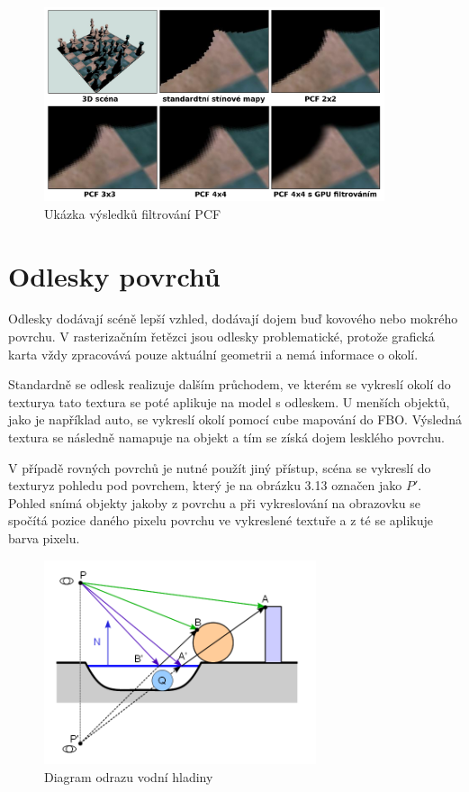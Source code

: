\documentclass[11pt,twoside,a4paper]{book}
\begin{document}
\begin{center}
\begin{figure}[h]
\includegraphics[width=100mm]{figures/pcf-example.png}
\caption{Ukázka výsledků filtrování PCF}
\end{figure}
\end{center}
\newpage


\section{Odlesky povrchů}
Odlesky dodávají scéně lepší vzhled, dodávají dojem buď kovového nebo mokrého povrchu. V rasterizačním řetězci jsou odlesky problematické, protože grafická karta vždy zpracovává pouze aktuální geometrii a nemá informace o okolí.

Standardně se odlesk realizuje dalším průchodem, ve kterém se vykreslí okolí do textury\linebreak a tato textura se poté aplikuje na model s odleskem. U menších objektů, jako je například auto, se vykreslí okolí pomocí cube mapování do FBO. Výsledná textura se následně namapuje na objekt a tím se získá dojem lesklého povrchu.

V případě rovných povrchů je nutné použít jiný přístup, scéna se vykreslí do textury\linebreak z pohledu pod povrchem, který je na obrázku 3.13 označen jako $P'$. Pohled snímá objekty jakoby z povrchu a při vykreslování na obrazovku se spočítá pozice daného pixelu povrchu ve vykreslené textuře a z té se aplikuje barva pixelu.

\begin{figure}[h!]
\begin{center}
\includegraphics[width=80mm]{figures/reflection-diagram.png}
\caption{Diagram odrazu vodní hladiny \cite{Kaplinski11}}
\end{center}
\end{figure}
\end{document}
